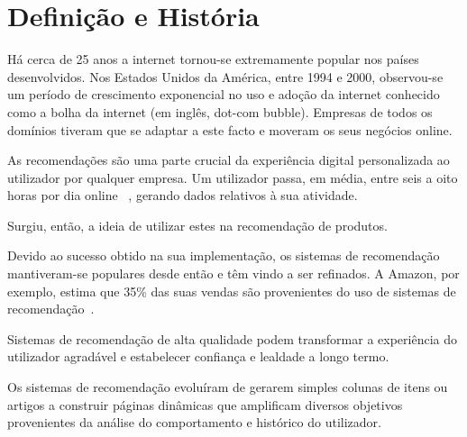 \section{Definição e História}

\par Há cerca de 25 anos a internet tornou-se extremamente popular nos países desenvolvidos. Nos Estados Unidos da América, entre 1994 e 2000, observou-se um período de crescimento exponencial no uso e adoção da internet conhecido como a bolha da internet (em inglês, dot-com bubble). Empresas de todos os domínios tiveram que se adaptar a este facto e moveram os seus negócios online. 

\par As recomendações são uma parte crucial da experiência digital personalizada ao utilizador por qualquer empresa. Um utilizador passa, em média, entre seis a oito horas por dia online ~\cite{ref_history1}, gerando dados relativos à sua atividade. 

\par Surgiu, então, a ideia de utilizar estes na recomendação de produtos. 

\par Devido ao sucesso obtido na sua implementação, os sistemas de recomendação mantiveram-se populares desde então e têm vindo a ser refinados. A Amazon, por exemplo, estima que 35\% das suas vendas são provenientes do uso de sistemas de recomendação~\cite{ref_history2}. 

\par Sistemas de recomendação de alta qualidade podem transformar a experiência do utilizador agradável e estabelecer confiança e lealdade a longo termo. 

\par Os sistemas de recomendação evoluíram de gerarem simples colunas de itens ou artigos a construir páginas dinâmicas que amplificam diversos objetivos provenientes da análise do comportamento e histórico do utilizador. 
